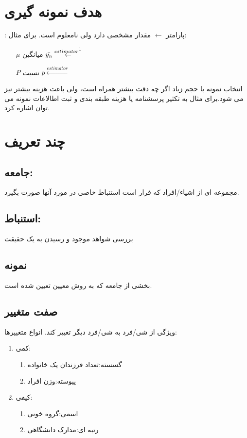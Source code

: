 \section*{هدف نمونه گیری}
\lr{$\theta$}: پارامتر   
$\leftarrow$
مقدار مشخصی دارد ولی نامعلوم است.
برای مثال:
\begin{itemize}
	\item[$\mu$] میانگین 
	$\bar{y_n} \overset{estimator\footnotemark}{\leftarrow} $
	\item[$P$]نسبت
	$\bar{p} \overset{estimator}{\leftarrow} $ 
\end{itemize}
انتخاب نمونه با حجم زیاد اگر چه 
\underline{دقت بیشتر}
همراه است، ولی باعث 
\underline{هزینه بیشتر }
نیز می شود.برای مثال به تکثیر پرسشنامه یا هزینه طبقه بندی و ثبت اطالاعات نمونه می توان اشاره کرد.
\section*{چند تعریف}
\subsection*{جامعه:}
مجموعه ای از اشیاء/افراد که قرار است استنباط خاصی در مورد آنها صورت بگیرد.
\subsection*{استنباط:}
بررسی شواهد موجود و رسیدن به یک حقیقت
\subsection*{نمونه}
بخشی از جامعه که به روش معیین تعیین شده است.
\subsection*{صفت متغییر}
ویژگی از شی/فرد به شی/فرد دیگر تغییر کند.
انواع متغییرها:
\begin{enumerate}
	\item کمی:
	\begin{enumerate}
		\item گسسته:تعداد فرزندان یک خانواده
		\item پیوسته:وزن افراد
	\end{enumerate}
	\item کیفی:
	\begin{enumerate}
		\item اسمی:گروه خونی
		\item رتبه ای:مدارک دانشگاهی
	\end{enumerate}
\end{enumerate}
